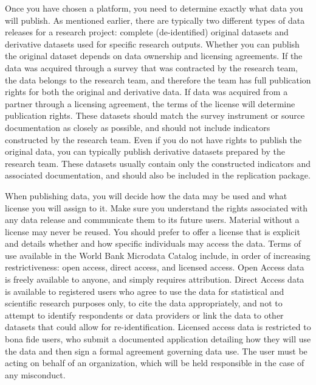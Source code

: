 Once you have chosen a platform, you need to determine exactly what data you will publish.
As mentioned earlier, there are typically two different types of data releases for a research project:
complete (de-identified) original datasets and derivative datasets used for specific research outputs.
Whether you can publish the original dataset depends on data ownership and licensing agreements.
If the data was acquired through a survey that was contracted by the research team,
the data belongs to the research team, 
and therefore the team has full publication rights for both the original and derivative data. 
If data was acquired from a partner through a licensing agreement, 
the terms of the license will determine publication rights. 
These datasets should match the survey instrument or source documentation as closely as possible,
and should not include indicators constructed by the research team. 
Even if you do not have rights to publish the original data, 
you can typically publish derivative datasets prepared by the research team.
These datasets usually contain only the constructed indicators and associated documentation,
and should also be included in the replication package.

When publishing data,
you will decide how the data may be used and what license you will assign to it.
Make sure you understand the rights associated with any data release
and communicate them to its future users.
Material without a license may never be reused.
You should prefer to offer a license that is explicit
and details whether and how specific individuals may access the data.
Terms of use available in the World Bank Microdata Catalog include,
in order of increasing restrictiveness:
open access, direct access, and licensed access.
Open Access data is freely available to anyone, and simply requires attribution.
Direct Access data is available to registered users who agree
to use the data for statistical and scientific research purposes only,
to cite the data appropriately,
and not to attempt to identify respondents or data providers
or link the data to other datasets that could allow for re-identification.
Licensed access data is restricted to bona fide users,
who submit a documented application detailing
how they will use the data and then sign a formal agreement governing data use.
The user must be acting on behalf of an organization,
which will be held responsible in the case of any misconduct.

